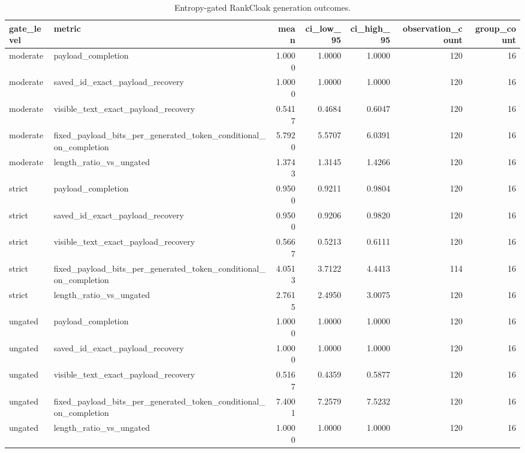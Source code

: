 \begin{table}
\caption{Entropy-gated RankCloak generation outcomes.}
\label{tab:entropy-gate-generation}
\begin{tabular}{llrrrrr}
\toprule
gate\_level & metric & mean & ci\_low\_95 & ci\_high\_95 & observation\_count & group\_count \\
\midrule
moderate & payload\_completion & 1.0000 & 1.0000 & 1.0000 & 120 & 16 \\
moderate & saved\_id\_exact\_payload\_recovery & 1.0000 & 1.0000 & 1.0000 & 120 & 16 \\
moderate & visible\_text\_exact\_payload\_recovery & 0.5417 & 0.4684 & 0.6047 & 120 & 16 \\
moderate & fixed\_payload\_bits\_per\_generated\_token\_conditional\_on\_completion & 5.7920 & 5.5707 & 6.0391 & 120 & 16 \\
moderate & length\_ratio\_vs\_ungated & 1.3743 & 1.3145 & 1.4266 & 120 & 16 \\
strict & payload\_completion & 0.9500 & 0.9211 & 0.9804 & 120 & 16 \\
strict & saved\_id\_exact\_payload\_recovery & 0.9500 & 0.9206 & 0.9820 & 120 & 16 \\
strict & visible\_text\_exact\_payload\_recovery & 0.5667 & 0.5213 & 0.6111 & 120 & 16 \\
strict & fixed\_payload\_bits\_per\_generated\_token\_conditional\_on\_completion & 4.0513 & 3.7122 & 4.4413 & 114 & 16 \\
strict & length\_ratio\_vs\_ungated & 2.7615 & 2.4950 & 3.0075 & 120 & 16 \\
ungated & payload\_completion & 1.0000 & 1.0000 & 1.0000 & 120 & 16 \\
ungated & saved\_id\_exact\_payload\_recovery & 1.0000 & 1.0000 & 1.0000 & 120 & 16 \\
ungated & visible\_text\_exact\_payload\_recovery & 0.5167 & 0.4359 & 0.5877 & 120 & 16 \\
ungated & fixed\_payload\_bits\_per\_generated\_token\_conditional\_on\_completion & 7.4001 & 7.2579 & 7.5232 & 120 & 16 \\
ungated & length\_ratio\_vs\_ungated & 1.0000 & 1.0000 & 1.0000 & 120 & 16 \\
\bottomrule
\end{tabular}
\end{table}
